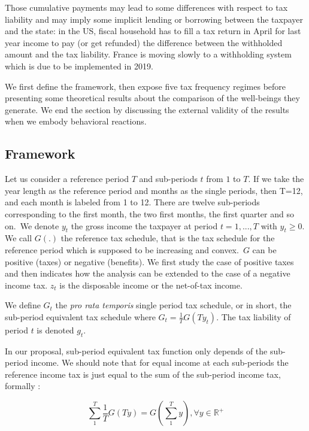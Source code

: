 Those cumulative payments may lead to some differences with respect to tax
liability and may imply some implicit lending or borrowing between the
taxpayer and the state: in the US, fiscal household has to fill a tax return
in April for last year income to pay (or get refunded) the difference between
the withholded amount and the tax liability. France is moving slowly to a
withholding system which is due to be implemented in 2019.

We first define the framework, then expose five tax frequency regimes before
presenting some theoretical results about the comparison of the well-beings
they generate. We end the section by discussing the external validity of the
results when we embody behavioral reactions.

\subsection{Framework}

Let us consider a reference period $T$ and sub-periods $t$ from $1$ to $T$. If
we take the year length as the reference period and months as the single
periods, then T=12, and each month is labeled from 1 to 12. There are twelve
sub-periods corresponding to the first month, the two first months, the first
quarter and so on.\ We denote $y_{t}$ the gross income the taxpayer at period
$t=1,...,T$ with $y_{t}\geq0$. We call $G(.)$ the reference tax schedule, that
is the tax schedule for the reference period which is supposed to be
increasing and convex.\ $G$ can be positive (taxes) or negative (benefits). We
first study the case of positive taxes and then indicates how the analysis can
be extended to the case of a negative income tax. $z_{t}$ is the disposable
income or the net-of-tax income.

We define $G_{t}$ the \textit{pro rata temporis} single period tax schedule,
or in short, the sub-period equivalent tax schedule where $G_{t}=\frac{1}%
{T}G(Ty_{t}).$ The tax liability of period $t$ is denoted $g_{t}$.

In our proposal, sub-period equivalent tax function only depends of the
sub-period income. We should note that for equal income at each sub-periods
the reference income tax is just equal to the sum of the sub-period income
tax, formally :%

\begin{equation}
\sum_{1}^{T}\frac{1}{T}G(Ty)=G(\sum_{1}^{T}y),\forall y\in{{\mathbb{R}}}%
^{+}\label{non_varying_eq}%
\end{equation}


